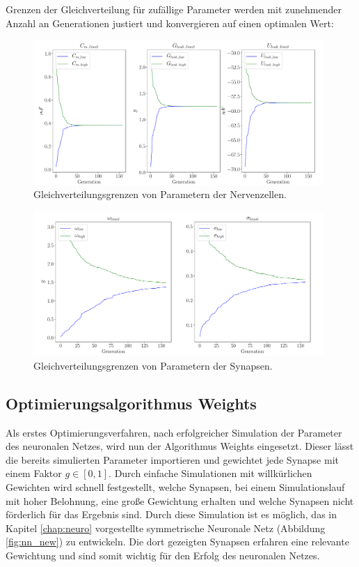 		Grenzen der Gleichverteilung für zufällige Parameter werden mit zunehmender Anzahl an Generationen justiert und konvergieren auf einen optimalen Wert:
		\begin{figure}[H]
			\centering
			\includegraphics[width=11cm]{figures/chap_implement/ga_neuron.pdf}
			\caption{Gleichverteilungsgrenzen von Parametern der Nervenzellen.}
			\label{fig:ga_1}
		\end{figure}
		\begin{figure}[H]
			\centering
			\includegraphics[width=11cm]{figures/chap_implement/ga_synapse.pdf}
			\caption{Gleichverteilungsgrenzen von Parametern der Synapsen.}
			\label{fig:ga_2}
		\end{figure}
	
	\subsection{Optimierungsalgorithmus Weights}
		Als erstes Optimierungsverfahren, nach erfolgreicher Simulation der Parameter des neuronalen Netzes, wird nun der Algorithmus Weights eingesetzt. Dieser lässt die bereits simulierten Parameter importieren und gewichtet jede Synapse mit einem Faktor $g\in[0,1]$. Durch einfache Simulationen mit willkürlichen Gewichten wird schnell festgestellt, welche Synapsen, bei einem Simulationslauf mit hoher Belohnung, eine große Gewichtung erhalten und welche Synapsen nicht förderlich für das Ergebnis sind. Durch diese Simulation ist es möglich, das in Kapitel \ref{chap:neuro} vorgestellte symmetrische Neuronale Netz (Abbildung \ref{fig:nn_new}) zu entwickeln. Die dort gezeigten Synapsen erfahren eine relevante Gewichtung und sind somit wichtig für den Erfolg des neuronalen Netzes.
		
